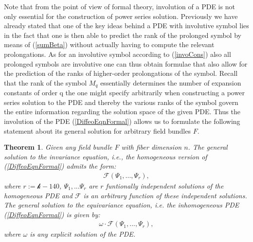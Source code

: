 \documentclass[a4paper,12pt, DIV=14, BCOR=5mm, twoside, headsepline, numbers=noenddot]{scrbook}
\newtheorem{theorem}{Theorem}[section]
\begin{document}
Note that from the point of view of formal theory, involution of a PDE is not only essential for the construction of power series solution. Previously we have already stated that one of the key ideas behind a PDE with involutive symbol lies in the fact that one is then able to predict the rank of the prolonged symbol by means of (\ref{sumBeta}) without actually having to compute the relevant prolongations. As for an involutive symbol according to (\ref{invoCons}) also all prolonged symbols are involutive one can thus obtain formulae that also allow for the prediction of the ranks of higher-order prolongations of the symbol. Recall that the rank of the symbol $M_q$ essentially determines the number of expansion constants of order q the one might specify arbitrarily when constructing a power series solution to the PDE  and thereby the various ranks of the symbol govern the entire information regarding the solution space of the given PDE.
Thus the involution of the PDE (\ref{DiffeoEqnFormal}) allows us to formulate the following statement about its general solution for arbitrary field bundles $F$.
\begin{theorem}\label{GeneralSol}
Given any field bundle $F$ with fiber dimension $n$. The general solution to the invariance equation, i.e., the homogeneous version of (\ref{DiffeoEqnFormal}) admits the form:
\begin{align}
    \mathcal{F} \left (\Psi_1,...,\Psi_r \right ),
\end{align}
where $r:=\mathcal{k}-140$, $\Psi_1,...\Psi_r$ are $r$ funtionally independent solutions of the homogeneous PDE and $\mathcal{F}$ is an arbitrary function of these independent solutions. The general solution to the equivariance equation, i.e. the inhomogeneous PDE (\ref{DiffeoEqnFormal}) is given by:
\begin{align}
    \omega \cdot \mathcal{F} \left (\Psi_1,...,\Psi_r \right ),
\end{align}
where $\omega$ is any explicit solution of the PDE. 
\end{theorem}
\end{document}
